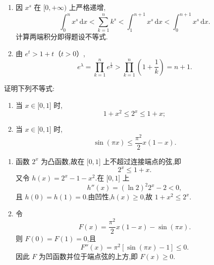 \begin{solution}
    \begin{enumerate}
        \item 因 $x^s$ 在 $\lbrack0,+\infty)$ 上严格递增,
              \[
                  \int_0^n x^s\,\mathrm{d}x
                  <\sum\limits_{k=1}^{n}k^s
                  <\int_1^{n+1}x^s\,\mathrm{d}x
                  <\int_0^{n+1}x^s\,\mathrm{d}x.
              \]
              计算两端积分即得题设不等式.

        \item 由 $e^t>1+t$（$t>0$）,
              \[
                  e^\lambda
                  =\prod\limits_{k=1}^{n}e^{\frac{1}{k}}
                  >\prod\limits_{k=1}^{n}\left(1+\dfrac{1}{k}\right)
                  =n+1.
              \]
    \end{enumerate}
\end{solution}




\begin{example}
    证明下列不等式:
    \begin{enumerate}
        \item 当 $x\in\lbrack 0,1\rbrack$ 时,
              \[
                  1+x^2\leq2^x\leq1+x;
              \]
        \item 当 $x\in\lbrack 0,1\rbrack$ 时,
              \[
                  \sin(\pi x)\leq\dfrac{\pi^2}{2}x(1-x).
              \]
    \end{enumerate}
\end{example}
\exampleblank

\begin{solution}
    \begin{enumerate}
        \item 函数 $2^x$ 为凸函数,故在 $\lbrack0,1\rbrack$ 上不超过连接端点的弦,即
              \[
                  2^x\leq1+x.
              \]
              又令 $h(x)=2^x-1-x^2$.在 $\lbrack0,1\rbrack$ 上
              \[
                  h''(x)=(\ln2)^2 2^x-2<0,
              \]
              且 $h(0)=h(1)=0$.由凹性,$h(x)\geq0$,故 $1+x^2\leq2^x$.

        \item 令
              \[
                  F(x)=\dfrac{\pi^2}{2}x(1-x)-\sin(\pi x).
              \]
              则 $F(0)=F(1)=0$,且
              \[
                  F''(x)=\pi^2[\sin(\pi x)-1]\leq0.
              \]
              因此 $F$ 为凹函数并位于端点弦的上方,即 $F(x)\geq0$.
    \end{enumerate}
\end{solution}

